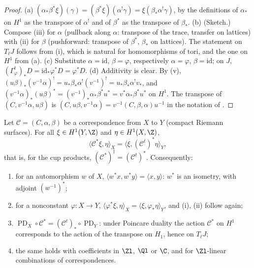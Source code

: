 \begin{proof}
(a) $(\alpha_*\beta^*\xi)(\gamma)=(\beta^*\xi)(\alpha^!\gamma)=\xi(\beta_*\alpha^!\gamma)$, by the definitions of $\alpha_*$ on $H^1$ as the transpose of $\alpha^!$ and of $\beta^*$ as the transpose of
$\beta_*$. (b) (Sketch.) Compose (iii) for $\alpha$ (pullback along $\alpha$: transpose of the trace, transfer on lattices) with (ii) for $\beta$
(pushforward: transpose of $\beta^*$, $\beta_*$ on lattices). The statement on $T_\ell J$ follows from (i), which is natural for homomorphisms of tori, and the one
on $H^1$ from (a). (c) Substitute $\alpha=\mathrm{id}$, $\beta=\varphi$, respectively $\alpha=\varphi$, $\beta=\mathrm{id}$; on $J$, $(\Gamma_\varphi^t)_*D=\mathrm{id}_*\varphi^*D=\varphi^*D$.
(d) Additivity is clear. By (v), $(u\beta)_*(v^{-1}\alpha)^!=u_*\beta_*\alpha^!(v^{-1})^!=u_*\beta_*\alpha^!v_*$, and $(v^{-1}\alpha)_*(u\beta)^*=(v^{-1})_*\alpha_*\beta^*u^*=v^*\alpha_*\beta^*u^*$
on $H^1$. The transpose of $(C,v^{-1}\alpha,u\beta)$ is $(C,u\beta,v^{-1}\alpha)=v^{-1}(C,\beta,\alpha)u^{-1}$ in the notation of .
\end{proof}

\begin{theorem}\label{thm:curves:adjoint-transpose}
Let $\mathcal C=(C,\alpha,\beta)$ be a correspondence from $X$ to $Y$ (compact Riemann surfaces). For all $\xi\in H^1(Y,\Z)$ and $\eta\in H^1(X,\Z)$,
\[
\langle\mathcal C^*\xi,\eta\rangle_X=\langle\xi,(\mathcal C^t)^*\eta\rangle_Y,
\]
that is, for the cup products, $(\mathcal C^*)^\dagger=(\mathcal C^t)^*$. Consequently:
\begin{enumerate}[label=(\alph*)]
\item for an automorphism $w$ of $X$, $\langle w^*x,w^*y\rangle=\langle x,y\rangle$: $w^*$ is an isometry, with adjoint $(w^{-1})^*$;
\item for a nonconstant $\varphi\colon X\to Y$, $\langle\varphi^*\xi,\eta\rangle_X=\langle\xi,\varphi_*\eta\rangle_Y$, and (i), (ii) follow again;
\item $\operatorname{PD}_X\circ\mathcal C^*=(\mathcal C^t)_*\circ\operatorname{PD}_Y$: under Poincare duality the action $\mathcal C^*$ on $H^1$ corresponds to the action of the transpose on $H_1$, hence on $T_\ell J$;
\item the same holds with coefficients in $\Zl$, $\Ql$ or $\C$, and for $\Zl$-linear combinations of correspondences.
\end{enumerate}
\end{theorem}

